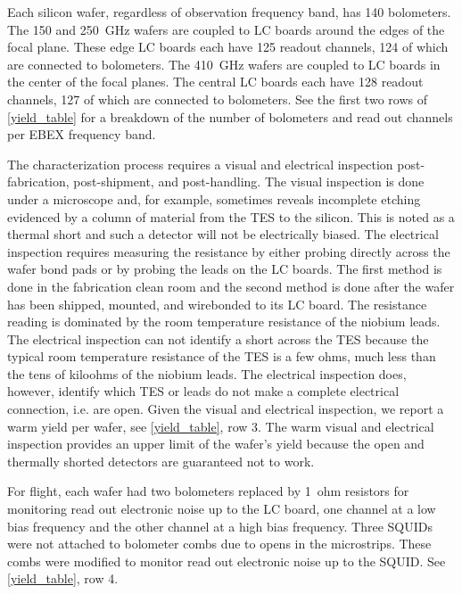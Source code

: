 
Each silicon wafer, regardless of observation frequency band, has 140 bolometers. %
The 150 and 250~GHz wafers are coupled to \ac{LC} boards around the edges of the focal plane. These edge \ac{LC} boards each have 125 readout channels, 124 of which are connected to bolometers. %
The 410~GHz wafers are coupled to \ac{LC} boards in the center of the focal planes. The central \ac{LC} boards each have 128 readout channels, 127 of which are connected to bolometers. %
See the first two rows of \TAB\ref{yield_table} for a breakdown of the number of bolometers and read out channels per \ac{EBEX} frequency band. 

The characterization process requires a visual and electrical inspection post-fabrication, post-shipment, and post-handling. 
The visual inspection is done under a microscope and, for example, sometimes reveals incomplete etching evidenced by a column of material from the \ac{TES} to the silicon. 
This is noted as a thermal short and such a detector will not be electrically biased. 
The electrical inspection requires measuring the resistance by either probing directly across the wafer bond pads or by probing the leads on the \ac{LC} boards. 
The first method is done in the fabrication clean room and the second method is done after the wafer has been shipped, mounted, and wirebonded to its \ac{LC} board. 
The resistance reading is dominated by the room temperature resistance of the niobium leads. 
The electrical inspection can not identify a short across the \ac{TES} because the typical room temperature resistance of the \ac{TES} is a few ohms, much less than the tens of kiloohms of the niobium leads. 
The electrical inspection does, however, identify which \ac{TES} or leads do not make a complete electrical connection, i.e. are open. 
Given the visual and electrical inspection, we report a warm yield per wafer, see \TAB\ref{yield_table}, row 3. 
The warm visual and electrical inspection provides an upper limit of the wafer's yield because the open and thermally shorted detectors are guaranteed not to work. 

For flight, each wafer had two bolometers replaced by 1~ohm resistors for monitoring read out electronic noise up to the \ac{LC} board, one channel at a low bias frequency and the other channel at a high bias frequency. Three \ac{SQUID}s were not attached to bolometer combs due to opens in the microstrips. These combs were modified to monitor read out electronic noise up to the \ac{SQUID}. See \TAB\ref{yield_table}, row 4. 

